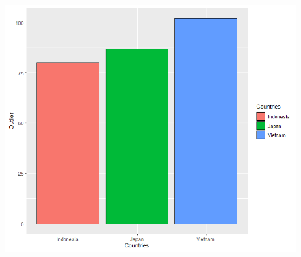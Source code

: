\documentclass[a4paper]{article}
\theoremstyle{definition}
\begin{document}
\begin{enumerate}[i)]
\begin{enumerate}[1)]
\begin{itemize}
\end{itemize}
\begin{figure}[h!]
	\begin{center}
        \includegraphics[scale=0.8]{Images/IV/iv (5) - 2.png}
	\end{center}
\end{figure}
\newpage


\end{enumerate}
\end{enumerate}
\end{document}
